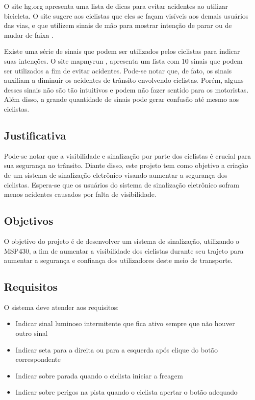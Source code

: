 \documentclass[conference]{IEEEtran}
\begin{document}
O site hg.org apresenta uma lista de dicas para evitar acidentes ao utilizar bicicleta. O site sugere aos ciclistas que eles se façam visíveis aos demais usuários das vias, e que utilizem sinais de mão para mostrar intenção de parar ou de mudar de faixa \cite{b4}.

Existe uma série de sinais que podem ser utilizados pelos ciclistas para indicar suas intenções. O site mapmyrun \cite{b5}, apresenta um lista com 10 sinais que podem ser utilizados a fim de evitar acidentes. Pode-se notar que, de fato, os sinais auxiliam a diminuir os acidentes de trânsito envolvendo ciclistas. Porém, alguns desses sinais não são tão intuitivos e podem não fazer sentido para os motoristas. Além disso, a grande quantidade de sinais pode gerar confusão até mesmo aos ciclistas.


\subsection{Justificativa}
Pode-se notar que a visibilidade e sinalização por parte dos ciclistas é crucial para sua segurança no trânsito. Diante disso, este projeto tem como objetivo a criação de um sistema de sinalização eletrônico visando aumentar a segurança dos ciclistas. Espera-se que os usuários do sistema de sinalização eletrônico sofram menos acidentes causados por falta de visibilidade.

\subsection{Objetivos}
O objetivo do projeto é de desenvolver um sistema de sinalização, utilizando o
MSP430, a fim de aumentar a visibilidade dos ciclistas durante seu trajeto para
aumentar a segurança e confiança dos utilizadores deste meio de transporte.

\subsection{Requisitos}
O sistema deve atender aos requisitos:
\begin{itemize}
  \item Indicar sinal luminoso intermitente que fica ativo sempre que não houver outro sinal
  \item Indicar seta para a direita ou para a esquerda após clique do botão correspondente
  \item Indicar sobre parada quando o ciclista iniciar a freagem
  \item Indicar sobre perigos na pista quando o ciclista apertar o botão adequado
\end{itemize}
\end{document}
